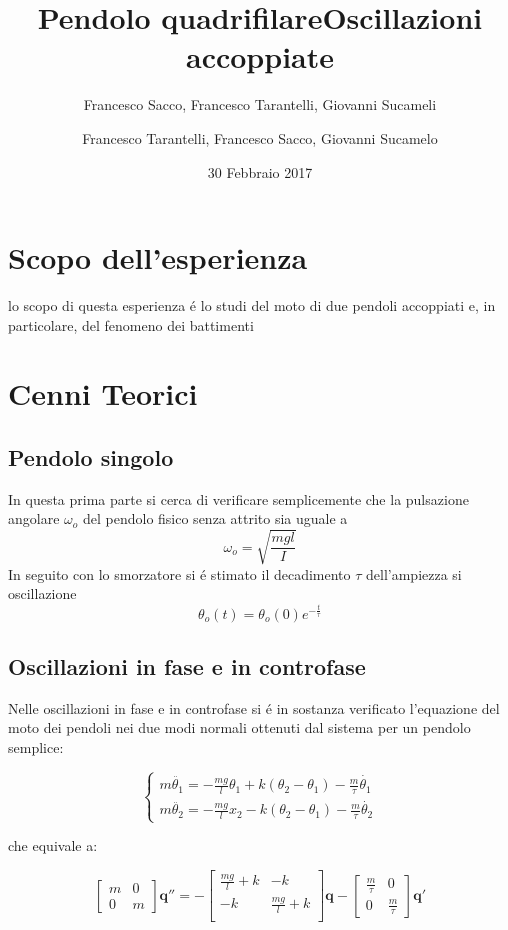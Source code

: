 \documentclass{exam}
\date{30 Febbraio 2017}
\title{Pendolo quadrifilare}
\author{Francesco Sacco, Francesco Tarantelli, Giovanni Sucameli}
\author{Francesco Tarantelli, Francesco Sacco, Giovanni Sucamelo}
\title{Oscillazioni accoppiate}
\begin{document}
	\maketitle
	\section{Scopo dell'esperienza}
		lo scopo di questa esperienza \'e lo studi del moto di due pendoli accoppiati e, in particolare, del fenomeno dei battimenti


	\section{Cenni Teorici}
		\subsection{Pendolo singolo}
			In questa prima parte si cerca di verificare semplicemente che la pulsazione angolare $\omega_o$ del pendolo fisico senza attrito sia uguale a 
			\begin{equation}
				\omega_o=\sqrt{\frac{mgl}{I}}
			\end{equation}
			In seguito con lo smorzatore si \'e stimato il decadimento $\tau $ dell'ampiezza si oscillazione
			\begin{equation}
				\theta_o(t)=\theta_o(0)e^{-\frac{t}{\tau}}
			\end{equation}
	\subsection{Oscillazioni in fase e in controfase}
		Nelle oscillazioni in fase e in controfase si \'e in sostanza verificato l'equazione del moto dei pendoli nei due modi normali ottenuti dal sistema per un pendolo semplice:

		\begin{equation}
			\begin{cases} 
				m \ddot{\theta_{1}}=-\frac{mg}{l}\theta_1 + k(\theta_2-\theta_1) -\frac{m}{\tau}\dot{\theta_1} \\
				m \ddot{\theta_{2}}=-\frac{mg}{l}x_2 -  k(\theta_2-\theta_1) - \frac{m}{\tau} \dot{\theta_{2}}
			\end{cases}
		\end{equation}

		che equivale a:

		\begin{equation}
			\begin{bmatrix}
				m & 0 \\
				0 & m
			\end{bmatrix}
			\mathbf{q''}=-
			\begin{bmatrix}
				\frac{mg}{l} + k & -k \\
				-k & \frac{mg}{l} + k \\
			\end{bmatrix}
			\mathbf{q} -
			\begin{bmatrix}
				\frac{m}{\tau} & 0 \\
				0 & \frac{m}{\tau} 
			\end{bmatrix}
			\mathbf{q'} 
		\end{equation}
\end{document}
